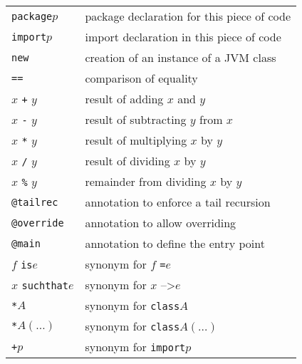\documentclass[12pt,a4paper]{book}
\makeatletter
\newcommand{\srccode}[1]{\texttt{{#1}}}
\newcommand{\reservedWord}[1]{{\color{blue}\srccode{#1}}\xspace}
\newcommand{\annotation}[1]{{\color{brown}\srccode{#1}}\xspace}
\newcommand{\sdef}{\srccode{=}\xspace}
\newcommand{\slambda}{{\tiny--\textgreater}\xspace}
\newcommand{\sclass}{\reservedWord{class}}
\newcommand{\spackage}{\reservedWord{package}}
\newcommand{\simport}{\reservedWord{import}}
\newcommand{\snew}{\reservedWord{new}}
\newcommand{\stailrec}{\annotation{@tailrec}}
\newcommand{\soverride}{\annotation{@override}}
\newcommand{\smain}{\annotation{@main}}
\newcommand{\sequalsSign}{\srccode{==}}
\newcommand{\sasterisk}{\srccode{*}}
\newcommand{\splus}{\srccode{+}}
\newcommand{\sis}{\reservedWord{is}}
\newcommand{\ssuchthat}{\reservedWord{suchthat}}
\makeatother
\begin{document}
\begin{tabular}{|l|l|}
        \hline
        \spackage $p$                                  & package declaration for this piece of code             \\
        \simport $p$                                   & import declaration in this piece of code               \\
        \snew                                          & creation of an instance of a JVM class                 \\
        \hline
        \sequalsSign                                   & comparison of equality                                 \\
        $x$ \srccode{+} $y$                            & result of adding $x$ and $y$                           \\
        $x$ \srccode{-} $y$                            & result of subtracting $y$ from $x$                     \\
        $x$ \srccode{*} $y$                            & result of multiplying $x$ by $y$                       \\
        $x$ \srccode{/} $y$                            & result of dividing $x$ by $y$                          \\
        $x$ \srccode{\%} $y$                           & remainder from dividing $x$ by $y$                     \\
        \hline
        \stailrec                                      & annotation to enforce a tail recursion                 \\
        \soverride                                     & annotation to allow overriding                         \\
        \smain                                         & annotation to define the entry point                   \\
        \hline
        $f$ \sis $e$                                   & synonym for $f$ \sdef $e$                              \\
        $x$ \ssuchthat $e$                             & synonym for $x$ \slambda $e$                           \\
        \sasterisk $A$                                 & synonym for \sclass $A$                                \\
        \sasterisk $A(\ldots)$                         & synonym for \sclass $A(\ldots)$                        \\
        \splus $p$                                     & synonym for \simport $p$                               \\
        \hline
    \end{tabular}
\end{document}
